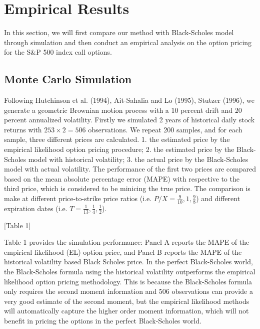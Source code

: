 \section{Empirical Results}
In this section,  we will first compare our method with Black-Scholes model through simulation and then conduct an empirical analysis on the option pricing for the S\&P 500 index call options.  

\subsection{Monte Carlo Simulation}

Following Hutchinson et al. (1994), Ait-Sahalia and Lo (1995), Stutzer (1996), we generate a geometric Brownian motion process with a 10 percent drift and 20 percent annualized volatility. Firstly we simulated 2 years of historical daily stock returns with $253\times 2=506$ observations. We repeat 200 samples, and for each sample, three different prices are calculated. 1. the estimated price by the empirical likelihood option pricing procedure; 2. the estimated price by the Black-Scholes model with historical volatility; 3. the actual price by the Black-Scholes model with actual volatility. The performance of the first two prices are compared based on the mean absolute percentage error (MAPE) with respective to the third price, which is considered to be minicing the true price. The comparison is make at different price-to-strike price ratios (i.e. $P/X=\frac{9}{10}, 1, \frac{9}{8}$) and different expiration dates (i.e. $T=\frac{1}{13}, \frac{1}{4}, \frac{1}{2}$). 


\begin{center}
[Table 1]
\end{center}

Table 1 provides the simulation performance: Panel A reports the MAPE of the empirical likelihood (EL) option price, and Panel B reports the MAPE of the historical volatility based Black Scholes price. In the perfect Black-Scholes world, the Black-Scholes formula using the historical volatility outperforms the empirical likelihood option pricing methodology. This is because the Black-Scholes formula only requires the second moment information and $506$ observations can provide a very good estimate of the second moment, but the empirical likelihood methods will automatically capture the higher order moment information, which will not benefit in pricing the options in the perfect Black-Scholes world.  

